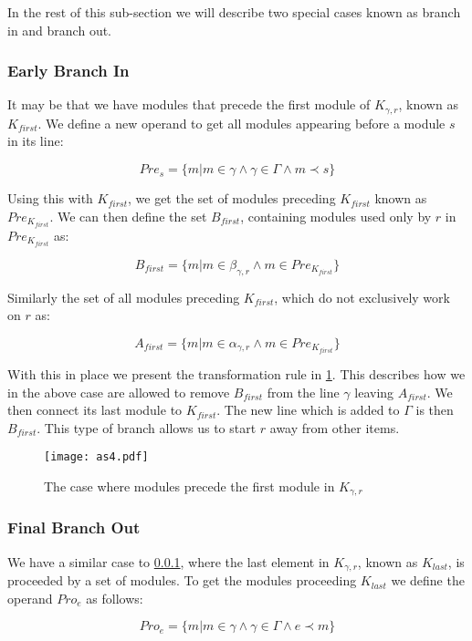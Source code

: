 In the rest of this sub-section we will describe two special cases known as branch in and branch out. 

\subsubsection{Early Branch In}\label{sssec:bi}
It may be that we have modules that precede the first module of $K_{\gamma ,r}$, known as $K_{first}$. We define a new operand to get all modules appearing before a module $s$ in its line:

\[Pre_{s} = \{m | m \in \gamma \land \gamma \in \Gamma \land m \prec s\}\]

Using this with $K_{first}$, we get the set of modules preceding $K_{first}$ known as $Pre_{K_{first}}$. We can then define the set $B_{first}$, containing modules used only by $r$ in $Pre_{K_{first}}$ as:

\[ B_{first} = \{m | m \in \beta_{\gamma ,r}  \land m \in Pre_{K_{first}} \} \]

Similarly the set of all modules preceding $K_{first}$, which do not exclusively work on $r$ as: 

\[ A_{first} = \{m | m \in \alpha_{\gamma ,r}  \land m \in Pre_{K_{first}} \} \]

With this in place we present the transformation rule in \cref{fig:asbranchin}. This describes how we in the above case are allowed to remove $B_{first}$ from the line $\gamma$ leaving  $A_{first}$. We then connect its last module to $K_{first}$. The new line which is added to $\Gamma$ is then $B_{first}$. This type of branch allows us to start $r$ away from other items.   


\begin{figure}[h]
\centering
\texttt{[image: as4.pdf]}
\caption{The case where modules precede the first module in $K_{\gamma ,r}$}
\label{fig:asbranchin}
\end{figure}

\subsubsection{Final Branch Out}
We have a similar case to \cref{sssec:bi}, where the last element in $K_{\gamma ,r}$, known as $K_{last}$, is proceeded by a set of modules. To get the modules proceeding $K_{last}$ we define the operand $Pro_{e}$ as follows:

\[Pro_{e} = \{m | m \in \gamma \land \gamma \in \Gamma \land e \prec  m \}\]

